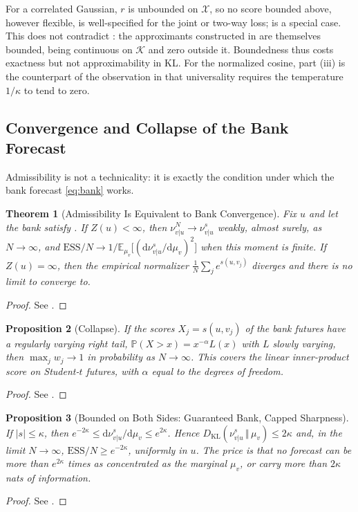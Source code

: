 \documentclass[11pt]{article}
\theoremstyle{plain}
\newtheorem{theorem}{Theorem}[section]
\newtheorem{proposition}[theorem]{Proposition}
\theoremstyle{definition}
\theoremstyle{remark}
\newcommand{\E}{\mathbb{E}}
\newcommand{\XX}{\mathcal{X}}
\newcommand{\KK}{\mathcal{K}}
\newcommand{\Dd}{\mathrm{d}}
\newcommand{\KL}[2]{D_{\mathrm{KL}}\!\left(#1\,\Vert\,#2\right)}
\newcommand{\abs}[1]{\left\lvert #1 \right\rvert}
\newcommand{\ESS}{\mathrm{ESS}}
\begin{document}
For a correlated Gaussian, $r$ is unbounded on $\XX$, so no score bounded
above, however flexible, is well-specified for the joint or two-way loss;
 is a special case. This does not contradict
: the approximants constructed in
\cite[Thm.~3.3]{stuart2026expressivity} are themselves bounded, being
continuous on $\KK$ and zero outside it. Boundedness thus costs exactness but
not approximability in KL. For the normalized cosine, part (iii) is the
counterpart of the observation in \cite[Thm.~4.2]{stuart2026expressivity}
that universality requires the temperature $1/\kappa$ to tend to zero.

\subsection{Convergence and Collapse of the Bank Forecast}
\label{ssec:bank}

Admissibility is not a technicality: it is exactly the condition under which
the bank forecast \eqref{eq:bank} works.

\begin{theorem}[Admissibility Is Equivalent to Bank Convergence]
 \label{thm:bank}
 Fix $u$ and let the bank satisfy . If $Z(u)<\infty$, then
 $\nu^{N}_{v\vert u}\to\nu^{s}_{v\vert u}$ weakly, almost surely, as
 $N\to\infty$, and
 $\ESS/N\to1/\E_{\mu_v}\bigl[(\Dd\nu^{s}_{v\vert u}/\Dd\mu_v)^{2}\bigr]$ when
 this moment is finite. If $Z(u)=\infty$, then the empirical normalizer
 $\frac1N\sum_{j}e^{s(u,v_j)}$ diverges and there is no limit to converge
 to.
\end{theorem}
\begin{proof}
 See .
\end{proof}

\begin{proposition}[Collapse]
 \label{prop:collapse}
 If the scores $X_j=s(u,v_j)$ of the bank futures have a regularly varying
 right tail, $\mathbb{P}(X>x)=x^{-\alpha}L(x)$ with $L$ slowly varying, then
 $\max_j w_j\to1$ in probability as $N\to\infty$. This covers the linear
 inner-product score on Student-$t$ futures, with $\alpha$ equal to the
 degrees of freedom.
\end{proposition}
\begin{proof}
 See .
\end{proof}

\begin{proposition}[Bounded on Both Sides: Guaranteed Bank, Capped Sharpness]
 \label{prop:twosided}
 If $\abs{s}\le\kappa$, then
 $e^{-2\kappa}\le\Dd\nu^{s}_{v\vert u}/\Dd\mu_v\le e^{2\kappa}$. Hence
 $\KL{\nu^{s}_{v\vert u}}{\mu_v}\le2\kappa$ and, in the limit $N\to\infty$,
 $\ESS/N\ge e^{-2\kappa}$, uniformly in $u$. The price is that no forecast can
 be more than $e^{2\kappa}$ times as concentrated as the marginal
 $\mu_v$, or carry more than $2\kappa$ nats of information.
\end{proposition}
\begin{proof}
 See .
\end{proof}
\end{document}
